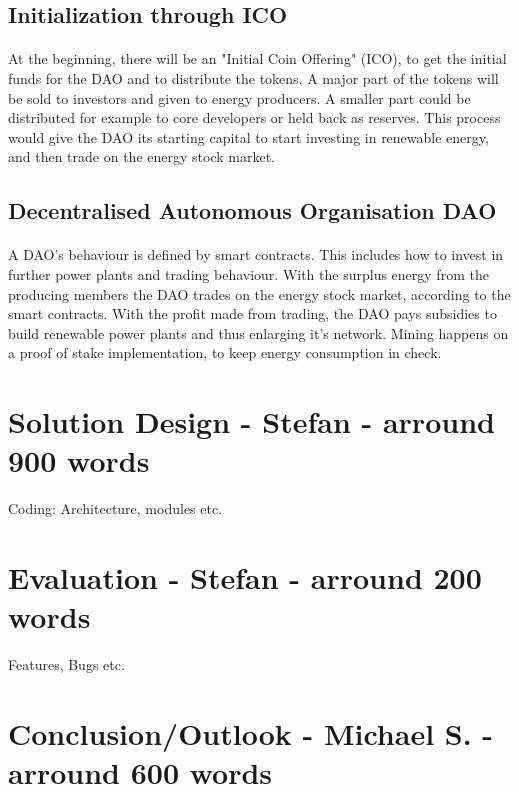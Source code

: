 \documentclass{scrartcl}
\begin{document}
	\subsection{Initialization through ICO}
	
	\paragraph{}
	At the beginning, there will be an "Initial Coin Offering" (ICO), to get the initial funds for the DAO and to distribute the tokens. A major part of the tokens will be sold to investors and given to energy producers. A smaller part could be distributed for example to core developers or held back as reserves. This process would give the DAO its starting capital to start investing in renewable energy, and then trade on the energy stock market. 
	\subsection{Decentralised Autonomous Organisation DAO}
	
	
	\paragraph{}
	A DAO's behaviour is defined by smart contracts. This includes how to invest in further power plants  and trading behaviour. With the surplus energy from the producing members the DAO trades on the energy stock market, according to the smart contracts. With the profit made from trading, the DAO pays subsidies to build renewable power plants and thus enlarging it's network. Mining happens on a proof of stake implementation, to keep energy consumption in check. 

    
   \section{Solution Design - Stefan - arround 900 words}
   Coding: Architecture, modules etc.
   
   \section{Evaluation - Stefan - arround 200 words}
	Features, Bugs etc.
	
    \section{Conclusion/Outlook - Michael S. - arround 600 words}
\end{document}
